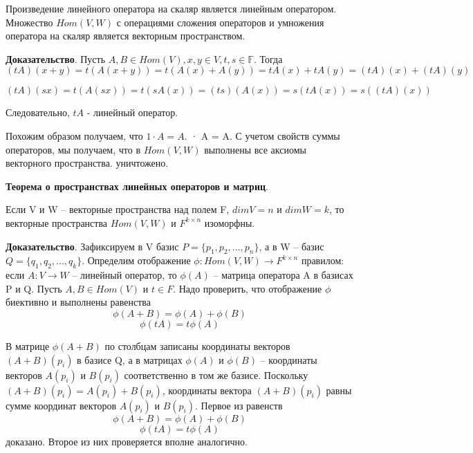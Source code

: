 \documentclass[a4paper]{article}
\begin{document}
{\begin{small}
Произведение линейного оператора на скаляр является линейным
оператором. Множество $Hom(V, W)$ с операциями сложения операторов
и умножения оператора на скаляр является векторным пространством.

\textbf{Доказательство}. Пусть $A,B \in Hom(V), x,y \in V, t, s \in \mathbb{F}$. Тогда
\begin{equation}
(tA)(x+y) = t(A(x+y)) = t(A(x) + A(y)) = tA(x) + tA(y) = (tA)(x) + (tA)(y)
\end{equation}

\begin{equation}
(tA)(sx) = t(A(sx)) = t(sA(x)) = (ts)(A(x)) = s(tA(x)) = s((tA)(x))
\end{equation}

Следовательно, $tA$ - линейный оператор.

Похожим образом получаем, что $1 \cdot A = A$. · A = A. С учетом свойств суммы операторов, мы получаем,
что в $Hom(V, W)$ выполнены все аксиомы векторного пространства. уничтожено.

\textbf{Теорема о пространствах линейных операторов и матриц}.

Если V и W – векторные пространства над полем F, $dim V = n$ и
$dim W = k$, то векторные пространства $Hom(V,W)$ и $F^{k\times n}$ изоморфны.

\textbf{Доказательство}. Зафиксируем в V базис $P = \{ p_1, p_2, . . . , p_n \}$, а в W –
базис $Q = \{ q_1, q_2, . . . , q_k \}$. Определим отображение
$\phi: Hom(V, W) \rightarrow F^{k \times n}$
правилом: если $A: V \rightarrow W$ – линейный оператор,
то $\phi(A)$ – матрица оператора A в базисах P и Q. Пусть $A, B \in Hom(V)$ и
$t \in F$. Надо проверить, что отображение $\phi$ биективно и выполнены равенства \begin{equation}
\phi (A+B) = \phi(A) + \phi(B)
\end{equation}
\begin{equation}
\phi(tA) = t \phi(A)
\end{equation}

В матрице $\phi(A+B)$ по столбцам записаны координаты векторов
$(A + B)(p_i)$ в базисе Q, а в матрицах $\phi(A)$ и $\phi(B)$ – координаты векторов
$A(p_i)$ и $B(p_i)$ соответственно в том же базисе. Поскольку
$(A + B)(p_i) = A(p_i) + B(p_i)$, координаты вектора $(A + B)(p_i)$ равны
сумме координат векторов $A(p_i)$ и $B(p_i)$. Первое из равенств \begin{equation}
\phi (A+B) = \phi(A) + \phi(B)
\end{equation}
\begin{equation}
\phi(tA) = t \phi(A)
\end{equation}
доказано. Второе из них проверяется вполне аналогично.


\end{small}}
\end{document}

